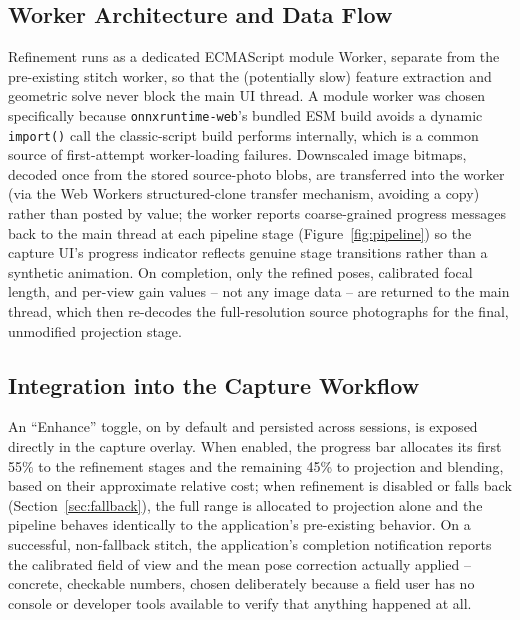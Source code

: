 \documentclass[11pt]{article}
\begin{document}
\subsection{Worker Architecture and Data Flow}

Refinement runs as a dedicated ECMAScript module Worker, separate from the pre-existing stitch worker, so that the (potentially slow) feature extraction and geometric solve never block the main UI thread. A module worker was chosen specifically because \texttt{onnxruntime-web}'s bundled ESM build avoids a dynamic \texttt{import()} call the classic-script build performs internally, which is a common source of first-attempt worker-loading failures. Downscaled image bitmaps, decoded once from the stored source-photo blobs, are transferred into the worker (via the Web Workers structured-clone transfer mechanism, avoiding a copy) rather than posted by value; the worker reports coarse-grained progress messages back to the main thread at each pipeline stage (Figure~\ref{fig:pipeline}) so the capture UI's progress indicator reflects genuine stage transitions rather than a synthetic animation. On completion, only the refined poses, calibrated focal length, and per-view gain values -- not any image data -- are returned to the main thread, which then re-decodes the full-resolution source photographs for the final, unmodified projection stage.

\subsection{Integration into the Capture Workflow}

An ``Enhance'' toggle, on by default and persisted across sessions, is exposed directly in the capture overlay. When enabled, the progress bar allocates its first 55\% to the refinement stages and the remaining 45\% to projection and blending, based on their approximate relative cost; when refinement is disabled or falls back (Section~\ref{sec:fallback}), the full range is allocated to projection alone and the pipeline behaves identically to the application's pre-existing behavior. On a successful, non-fallback stitch, the application's completion notification reports the calibrated field of view and the mean pose correction actually applied -- concrete, checkable numbers, chosen deliberately because a field user has no console or developer tools available to verify that anything happened at all.

\end{document}
